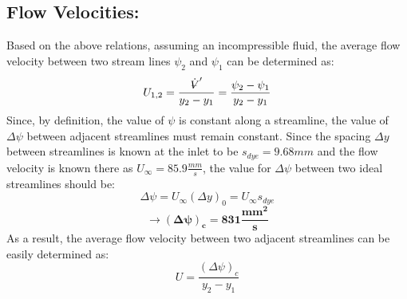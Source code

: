 \documentclass[12pt]{article}
\makeatletter
\DeclareRobustCommand{\volume}{\text{\volumedash}V}
\newcommand{\volumedash}{%
	\makebox[0pt][l]{%
		\ooalign{\hfil\hphantom{$\m@th V$}\hfil\cr\kern0.08em--\hfil\cr}%
	}%
}
\makeatother
\begin{document}
	\hfill\break\break
	\subsection{Flow Velocities:}
	Based on the above relations, assuming an incompressible fluid, the average flow velocity between two stream lines $\psi_{2}$ and $\psi_{1}$ can be determined as:
	\begin{equation}
	U_{1,2}= \frac{\dot{\volume}'}{y_2-y_1}=\frac{\psi_{2}-\psi_{1}}{y_2-y_1}
	\end{equation}
	\hfill\break\break
	Since, by definition, the value of $\psi$ is constant along a streamline, the value of $\Delta\psi$ between adjacent streamlines must remain constant.
	\hfill\break
	Since the spacing $\Delta y$ between streamlines is known at the inlet to be $s_{dye}=9.68mm$ and the flow velocity is known there as $U_\infty=85.9 \frac{mm}{s}$, the value for $\Delta\psi$ between two ideal streamlines should be:
	$$\Delta\psi=U_\infty(\Delta y)_0=U_\infty s_{dye}$$
	$$\rightarrow \pmb{(\Delta\psi )_c= 831 \frac{mm^2}{s}}$$	
	\hfill\break\break
	As a result, the average flow velocity between two adjacent streamlines can be easily determined as:
	\begin{equation}
		U = \frac{(\Delta\psi)_c}{y_2-y_1}
	\end{equation}
	
	\hfill\break\break
\end{document}
